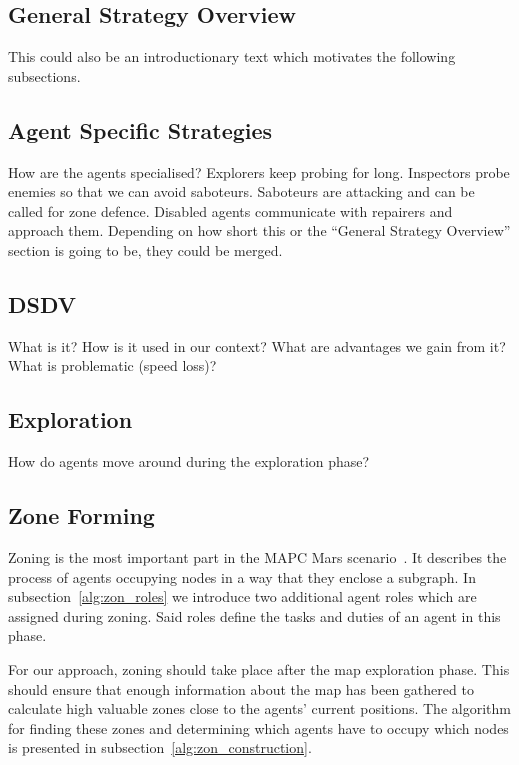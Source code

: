 \subsection{General Strategy Overview}
This could also be an introductionary text which motivates the following subsections.

\subsection{Agent Specific Strategies}
How are the agents specialised? Explorers keep probing for long. Inspectors probe enemies so that we can avoid saboteurs. Saboteurs are attacking and can be called for zone defence. Disabled agents communicate with repairers and approach them. Depending on how short this or the ``General Strategy Overview'' section is going to be, they could be merged.

\subsection{DSDV}
What is it? How is it used in our context? What are advantages we gain from it? What is problematic (speed loss)?

\subsection{Exploration}
How do agents move around during the exploration phase?

\subsection{Zone Forming}
Zoning is the most important part in the MAPC Mars scenario~\cite{ahlbrecht_mapc_2014}.%
It describes the process of agents occupying nodes in a way that they enclose a subgraph. In subsection~\ref{alg:zon_roles} we introduce two additional agent roles which are assigned during zoning. Said roles define the tasks and duties of an agent in this phase.

For our approach, zoning should take place after the map exploration phase. This should ensure that enough information about the map has been gathered to calculate high valuable zones close to the agents' current positions. The algorithm for finding these zones and determining which agents have to occupy which nodes is presented in subsection~\ref{alg:zon_construction}.

